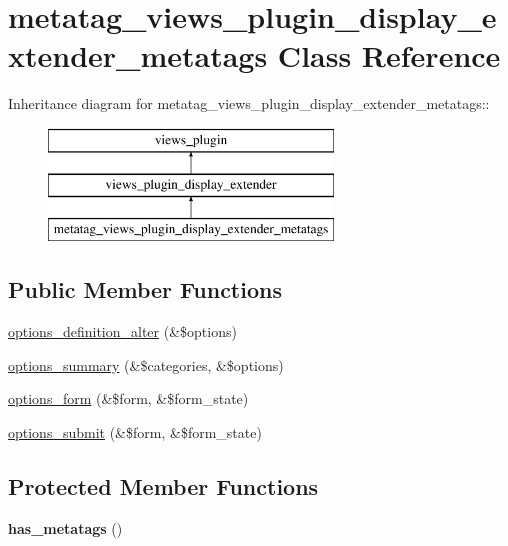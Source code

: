 \hypertarget{classmetatag__views__plugin__display__extender__metatags}{
\section{metatag\_\-views\_\-plugin\_\-display\_\-extender\_\-metatags Class Reference}
\label{classmetatag__views__plugin__display__extender__metatags}
}
Inheritance diagram for metatag\_\-views\_\-plugin\_\-display\_\-extender\_\-metatags::\begin{figure}[H]
\begin{center}
\leavevmode
\includegraphics[height=3cm]{classmetatag__views__plugin__display__extender__metatags}
\end{center}
\end{figure}
\subsection*{Public Member Functions}
\begin{DoxyCompactItemize}
\item 
\hyperlink{classmetatag__views__plugin__display__extender__metatags_abde4b6c185453983c25a43ceed776603}{options\_\-definition\_\-alter} (\&\$options)
\item 
\hyperlink{classmetatag__views__plugin__display__extender__metatags_a576b24d90f7f9d21a9409670afc10a6f}{options\_\-summary} (\&\$categories, \&\$options)
\item 
\hyperlink{classmetatag__views__plugin__display__extender__metatags_a546520f911ecde644d594b6231aabb3a}{options\_\-form} (\&\$form, \&\$form\_\-state)
\item 
\hyperlink{classmetatag__views__plugin__display__extender__metatags_a7485da0c4d0a0b1bab8e2df1fceca06b}{options\_\-submit} (\&\$form, \&\$form\_\-state)
\end{DoxyCompactItemize}
\subsection*{Protected Member Functions}
\begin{DoxyCompactItemize}
\item 
\hypertarget{classmetatag__views__plugin__display__extender__metatags_a72d10fa13e786f1151194372a8bdfd55}{
{\bfseries has\_\-metatags} ()}
\label{classmetatag__views__plugin__display__extender__metatags_a72d10fa13e786f1151194372a8bdfd55}

\end{DoxyCompactItemize}


